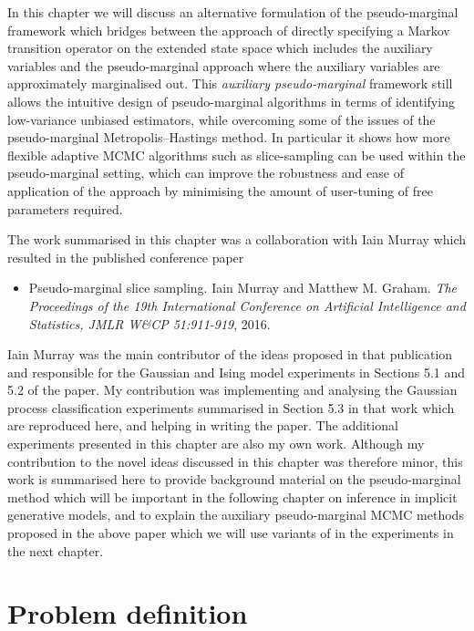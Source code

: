 In this chapter we will discuss an alternative formulation of the pseudo-marginal framework which bridges between the approach of directly specifying a Markov transition operator on the extended state space which includes the auxiliary variables and the pseudo-marginal approach where the auxiliary variables are approximately marginalised out. This \emph{auxiliary pseudo-marginal} framework still allows the intuitive design of pseudo-marginal algorithms in terms of identifying low-variance unbiased estimators, while overcoming some of the issues of the pseudo-marginal Metropolis--Hastings method. In particular it shows how more flexible adaptive \ac{MCMC} algorithms such as slice-sampling can be used within the pseudo-marginal setting, which can improve the robustness and ease of application of the approach by minimising the amount of user-tuning of free parameters required.

The work summarised in this chapter was a collaboration with Iain Murray which resulted in the published conference paper
\begin{itemize}
 \item Pseudo-marginal slice sampling. Iain Murray and Matthew M. Graham. \emph{The Proceedings of the 19th International Conference on Artificial Intelligence and Statistics, JMLR W\&CP 51:911-919}, 2016.
\end{itemize}
Iain Murray was the main contributor of the ideas proposed in that publication and responsible for the Gaussian and Ising model experiments in Sections 5.1 and 5.2 of the paper. My contribution was implementing and analysing the Gaussian process classification experiments summarised in Section 5.3 in that work which are reproduced here, and helping in writing the paper. The additional experiments presented in this chapter are also my own work. Although my contribution to the novel ideas discussed in this chapter was therefore minor, this work is summarised here to provide background material on the pseudo-marginal method which will be important in the following chapter on inference in implicit generative models, and to explain the auxiliary pseudo-marginal \ac{MCMC} methods proposed in the above paper which we will use variants of in the experiments in the next chapter.

\section{Problem definition}

